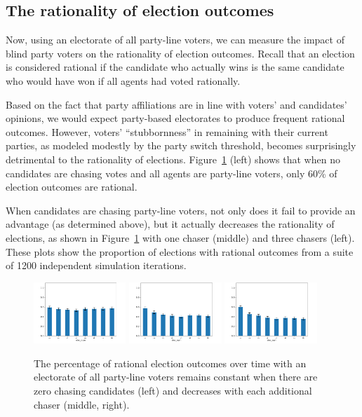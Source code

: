 \subsection{The rationality of election outcomes}

Now, using an electorate of all party-line voters, we can measure the impact of
blind party voters on the rationality of election outcomes. Recall that an
election is considered rational if the candidate who actually wins is the same
candidate who would have won if all agents had voted rationally.
 
Based on the fact that party affiliations are in line with voters' and
candidates' opinions, we would expect party-based electorates to produce
frequent rational outcomes. However, voters' ``stubbornness'' in remaining with
their current parties, as modeled modestly by the party switch threshold,
becomes surprisingly detrimental to the rationality of elections.
Figure~\ref{all_party_hurt_rat} (left) shows that when no candidates are
chasing votes and all agents are party-line voters, only 60\% of election
outcomes are rational. 

When candidates are chasing party-line voters, not only does it 
fail to provide an advantage (as determined above), but it actually decreases the rationality of elections, as shown in Figure~\ref{all_party_hurt_rat} with one chaser (middle) and three chasers (left). These plots show the proportion of elections with
rational outcomes from a suite of 1200 independent simulation iterations.


\begin{figure}[ht]
	\centering
	\includegraphics[width=0.31\textwidth]{assets/all_party_0_chasers_rationality_stays_same.png}
	\includegraphics[width=0.31\textwidth]{assets/all_party_1_chaser_rationality_decreases.png}
	\includegraphics[width=0.31\textwidth]{assets/all_party_3_chasers_rationality_decreases.png}
	\caption{The percentage of rational election outcomes over time with an electorate of all party-line voters 
		remains constant when there are zero chasing candidates (left) and decreases with each additional chaser (middle, right).}
	\label{all_party_hurt_rat}
\end{figure}

